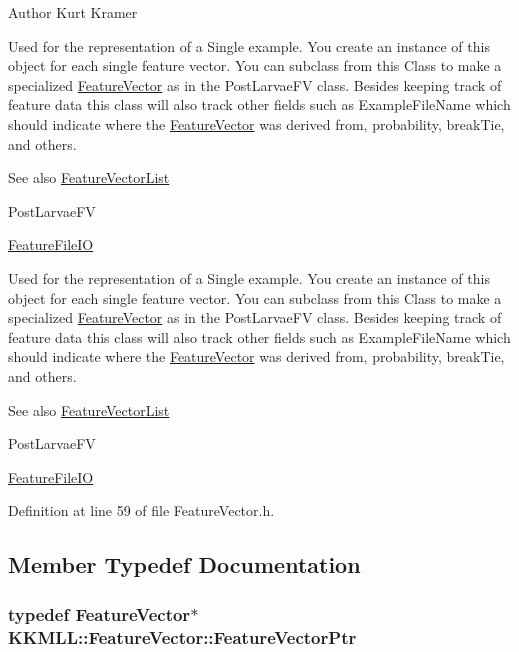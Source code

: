 \begin{DoxyAuthor}{Author}
Kurt Kramer
\end{DoxyAuthor}
Used for the representation of a Single example. You create an instance of this object for each single feature vector. You can subclass from this Class to make a specialized \hyperlink{class_k_k_m_l_l_1_1_feature_vector}{Feature\+Vector} as in the Post\+Larvae\+FV class. Besides keeping track of feature data this class will also track other fields such as Example\+File\+Name which should indicate where the \hyperlink{class_k_k_m_l_l_1_1_feature_vector}{Feature\+Vector} was derived from, probability, break\+Tie, and others. \begin{DoxySeeAlso}{See also}
\hyperlink{class_k_k_m_l_l_1_1_feature_vector_list}{Feature\+Vector\+List} 

Post\+Larvae\+FV 

\hyperlink{class_k_k_m_l_l_1_1_feature_file_i_o}{Feature\+File\+IO}
\end{DoxySeeAlso}
Used for the representation of a Single example. You create an instance of this object for each single feature vector. You can subclass from this Class to make a specialized \hyperlink{class_k_k_m_l_l_1_1_feature_vector}{Feature\+Vector} as in the Post\+Larvae\+FV class. Besides keeping track of feature data this class will also track other fields such as Example\+File\+Name which should indicate where the \hyperlink{class_k_k_m_l_l_1_1_feature_vector}{Feature\+Vector} was derived from, probability, break\+Tie, and others. \begin{DoxySeeAlso}{See also}
\hyperlink{class_k_k_m_l_l_1_1_feature_vector_list}{Feature\+Vector\+List} 

Post\+Larvae\+FV 

\hyperlink{class_k_k_m_l_l_1_1_feature_file_i_o}{Feature\+File\+IO} 
\end{DoxySeeAlso}


Definition at line 59 of file Feature\+Vector.\+h.



\subsection{Member Typedef Documentation}
\subsubsection[{\texorpdfstring{Feature\+Vector\+Ptr}{FeatureVectorPtr}}]{\setlength{\rightskip}{0pt plus 5cm}typedef {\bf Feature\+Vector}$\ast$ {\bf K\+K\+M\+L\+L\+::\+Feature\+Vector\+::\+Feature\+Vector\+Ptr}}\hypertarget{class_k_k_m_l_l_1_1_feature_vector_a56571234d7b7fae4f6940ed9640aabf4}{}\label{class_k_k_m_l_l_1_1_feature_vector_a56571234d7b7fae4f6940ed9640aabf4}



